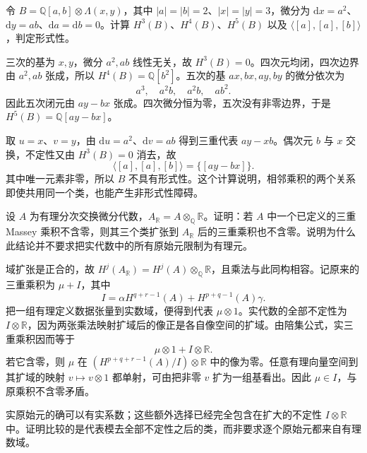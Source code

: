 \begin{exercise}\label{g2:ex:small-nonformal-model}
	令 \(B=\mathbb Q[a,b]\otimes\Lambda(x,y)\)，其中 \(|a|=|b|=2\)、\(|x|=|y|=3\)，微分为 \(\mathrm dx=a^2\)、\(\mathrm dy=ab\)、\(\mathrm da=\mathrm db=0\)。计算 \(H^3(B)\)、\(H^4(B)\)、\(H^5(B)\) 以及 \(\langle[a],[a],[b]\rangle\)，判定形式性。
\end{exercise}
\begin{solution}
	三次的基为 \(x,y\)，微分 \(a^2,ab\) 线性无关，故 \(H^3(B)=0\)。四次元均闭，四次边界由 \(a^2,ab\) 张成，所以 \(H^4(B)=\mathbb Q[b^2]\)。五次的基 \(ax,bx,ay,by\) 的微分依次为
	\[
		a^3,\quad a^2b,\quad a^2b,\quad ab^2.
	\]
	因此五次闭元由 \(ay-bx\) 张成。四次微分恒为零，五次没有非零边界，于是 \(H^5(B)=\mathbb Q[ay-bx]\)。

	取 \(u=x\)、\(v=y\)，由 \(\mathrm du=a^2\)、\(\mathrm dv=ab\) 得到三重代表 \(ay-xb\)。偶次元 \(b\) 与 \(x\) 交换，不定性又由 \(H^3(B)=0\) 消去，故
	\[
		\langle[a],[a],[b]\rangle=\{[ay-bx]\}.
	\]
	其中唯一元素非零，所以 \(B\) 不具有形式性。这个计算说明，相邻乘积的两个关系即使共用同一个类，也能产生非形式性障碍。
\end{solution}

\begin{exercise}\label{g2:ex:massey-extension-scalars}
	设 \(A\) 为有理分次交换微分代数，\(A_{\mathbb R}=A\otimes_{\mathbb Q}\mathbb R\)。证明：若 \(A\) 中一个已定义的三重 Massey 乘积不含零，则其三个类扩张到 \(A_{\mathbb R}\) 后的三重乘积也不含零。说明为什么此结论并不要求把实代数中的所有原始元限制为有理元。
\end{exercise}
\begin{solution}
	域扩张是正合的，故 \(H^j(A_{\mathbb R})=H^j(A)\otimes_{\mathbb Q}\mathbb R\)，且乘法与此同构相容。记原来的三重乘积为 \(\mu+I\)，其中
	\[
		I=\alpha H^{q+r-1}(A)+H^{p+q-1}(A)\gamma.
	\]
	把一组有理定义数据张量到实数域，便得到代表 \(\mu\otimes1\)。实代数的全部不定性为 \(I\otimes\mathbb R\)，因为两张乘法映射扩域后的像正是各自像空间的扩域。由陪集公式，实三重乘积因而等于
	\[
		\mu\otimes1+I\otimes\mathbb R.
	\]
	若它含零，则 \(\mu\) 在 \((H^{p+q+r-1}(A)/I)\otimes\mathbb R\) 中的像为零。任意有理向量空间到其扩域的映射 \(v\mapsto v\otimes1\) 都单射，可由把非零 \(v\) 扩为一组基看出。因此 \(\mu\in I\)，与原乘积不含零矛盾。

	实原始元的确可以有实系数；这些额外选择已经完全包含在扩大的不定性 \(I\otimes\mathbb R\) 中。证明比较的是代表模去全部不定性之后的类，而非要求逐个原始元都来自有理数域。
\end{solution}

